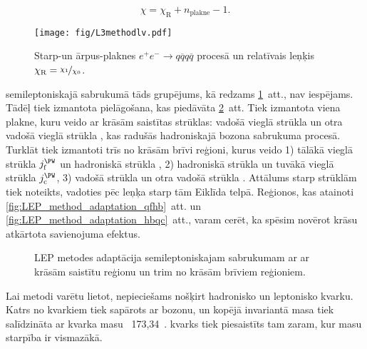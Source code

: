 \begin{equation}
  \chi=\chi_{\text{R}} + n_{\text{plakne}} - 1.
\end{equation}

\begin{figure}[hbtp]
  \centering
  \texttt{[image: fig/L3methodlv.pdf]}
  \caption{Starp-\PW un ārpus-\PW plaknes $e^{+}e^{-}\rightarrow q\overline{q}q\overline{q}$ procesā un relatīvais leņķis $\chi_{\text{R}}=\nicefrac{\chi_{1}}{\chi_{0}}$.}
  \label{fig:LEP_method}
\end{figure}

 \ttbar semileptoniskajā sabrukumā tāds grupējums, kā redzams \ref{fig:LEP_method}~att., nav iespējams. Tādēļ tiek izmantota pielāgošana, kas piedāvāta \ref{fig:LEP_method_adaptation}~att. Tiek izmantota viena plakne, kuru veido ar krāsām saistītas strūklas: vadošā vieglā strūkla \leadingjet un otra vadošā vieglā strūkla \scndleadingjet, kas radušās hadroniskajā \PW bozona sabrukuma procesā. Turklāt tiek izmantoti trīs no krāsām brīvi reģioni, kurus veido 1) tālākā vieglā strūkla $j^{\PW}_{\text{f}}$ un hadroniskā \cPqb strūkla \hadronicb, 2) hadroniskā \cPqb strūkla \hadronicb un tuvākā vieglā strūkla $j^{\PW}_{\text{c}}$, 3) vadošā \cPqb strūkla \leadingb un otra vadošā \cPqb strūkla \scndleadingb. Attālums starp strūklām tiek noteikts, vadoties pēc leņķa starp tām Eiklīda telpā. Reģionos, kas atainoti \ref{fig:LEP_method_adaptation_qfhb}~att. un \ref{fig:LEP_method_adaptation_hbqc}~att., varam cerēt, ka spēsim novērot krāsu atkārtota savienojuma efektus.

\begin{figure}[hbtp]
  \centering
  \def\twidth{0.24}
  \hfil
 \hfil
  \hfil
  \caption{LEP metodes adaptācija \ttbar semileptoniskajam sabrukumam ar ar krāsām saistītu reģionu un trim no krāsām brīviem reģioniem.}
  \label{fig:LEP_method_adaptation}
\end{figure}

Lai metodi varētu lietot, nepieciešams nošķirt hadronisko un leptonisko \cPqb kvarku. Katrs no \cPqb kvarkiem tiek sapārots ar \PW bozonu, un kopējā invariantā masa tiek salīdzināta ar \cPqt kvarka masu \textendash\ 173,34~\GeV. \cPqb kvarks tiek piesaistīts tam zaram, kur masu starpība ir vismazākā. 

